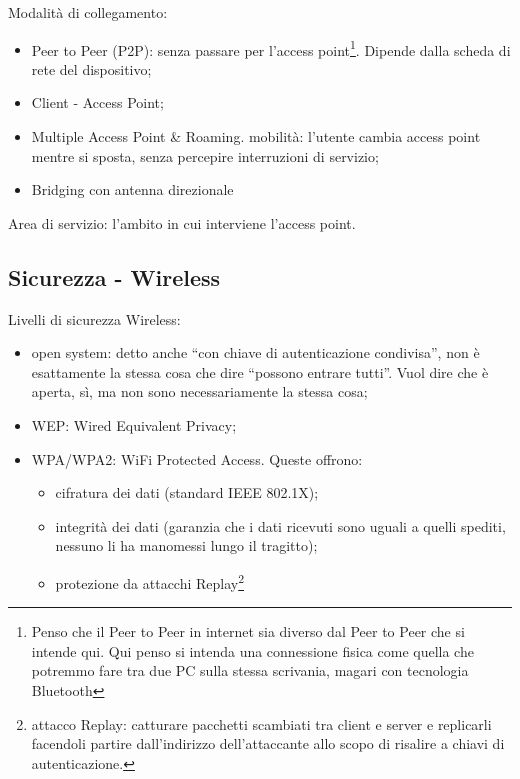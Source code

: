\noindent Modalità di collegamento:
\begin{itemize}
    \item Peer to Peer (P2P): senza passare per l'access point\footnote{Penso che il Peer to Peer in internet sia diverso dal Peer to Peer che si intende qui. Qui penso si intenda una connessione fisica come quella che potremmo fare tra due PC sulla stessa scrivania, magari con tecnologia Bluetooth}. Dipende dalla scheda di rete del dispositivo;
    \item Client - Access Point;
    \item Multiple Access Point \& Roaming. mobilità: l'utente cambia access point mentre si sposta, senza percepire interruzioni di servizio;
    \item Bridging con antenna direzionale
\end{itemize}
\noindent Area di servizio: l'ambito in cui interviene l'access point.\\

\subsection*{Sicurezza - Wireless}
\noindent Livelli di sicurezza Wireless:
\begin{itemize}
    \item open system: detto anche ``con chiave di autenticazione condivisa'', non è esattamente la stessa cosa che dire ``possono entrare tutti''. Vuol dire che è aperta, sì, ma non sono necessariamente la stessa cosa;
    \item WEP: Wired Equivalent Privacy;
    \item WPA/WPA2: WiFi Protected Access. Queste offrono:
    \begin{itemize}
        \item cifratura dei dati (standard IEEE 802.1X);
        \item integrità dei dati (garanzia che i dati ricevuti sono uguali a quelli spediti, nessuno li ha manomessi lungo il tragitto);
        \item protezione da attacchi Replay\footnote{attacco Replay: catturare pacchetti scambiati tra client e server e replicarli facendoli partire dall'indirizzo dell'attaccante allo scopo di risalire a chiavi di autenticazione.}
    \end{itemize}
\end{itemize}

